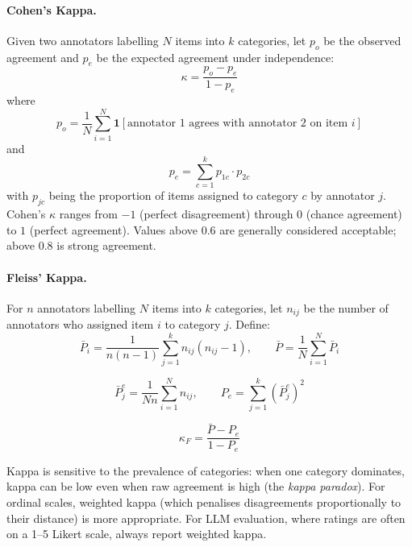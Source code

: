 \paragraph{Cohen’s Kappa.}
\label{cohens-kappa.}

Given two annotators labelling $N$ items into $k$ categories, let $p_o$ be the observed agreement and $p_e$ be the expected agreement under independence: 
\begin{equation}
    \kappa = \frac{p_o - p_e}{1 - p_e}
\label{eq:cohens-kappa}
\end{equation}
 where 
\begin{equation}
    p_o = \frac{1}{N}\sum_{i=1}^{N} \mathbf{1}[\text{annotator 1 agrees with annotator 2 on item } i]
\end{equation}
 and 
\begin{equation}
    p_e = \sum_{c=1}^{k} p_{1c} \cdot p_{2c}
\end{equation}
 with $p_{jc}$ being the proportion of items assigned to category $c$ by annotator $j$. Cohen’s $\kappa$ ranges from $-1$ (perfect disagreement) through $0$ (chance agreement) to $1$ (perfect agreement). Values above $0.6$ are generally considered acceptable; above $0.8$ is strong agreement.

\paragraph{Fleiss’ Kappa.}
\label{fleiss-kappa.}

For $n$ annotators labelling $N$ items into $k$ categories, let $n_{ij}$ be the number of annotators who assigned item $i$ to category $j$. Define: 
\begin{equation}
    \bar{P}_i = \frac{1}{n(n-1)} \sum_{j=1}^{k} n_{ij}(n_{ij} - 1), \qquad \bar{P} = \frac{1}{N}\sum_{i=1}^{N}\bar{P}_i
\end{equation}
 
\begin{equation}
    \bar{P}_j^e = \frac{1}{Nn}\sum_{i=1}^{N} n_{ij}, \qquad P_e = \sum_{j=1}^{k} \left(\bar{P}_j^e\right)^2
\end{equation}
 
\begin{equation}
    \kappa_F = \frac{\bar{P} - P_e}{1 - P_e}
\end{equation}

\begin{warningbox}
Kappa is sensitive to the prevalence of categories: when one category dominates, kappa can be low even when raw agreement is high (the \emph{kappa paradox}). For ordinal scales, weighted kappa (which penalises disagreements proportionally to their distance) is more appropriate. For LLM evaluation, where ratings are often on a 1--5 Likert scale, always report weighted kappa.
\end{warningbox}

